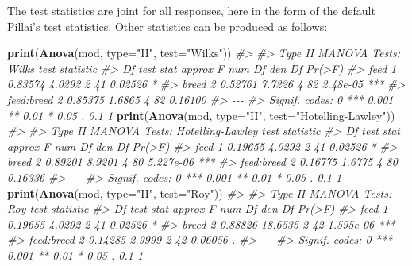 \documentclass[
]{article}
\newenvironment{Shaded}{\begin{snugshade}}{\end{snugshade}}
\newcommand{\AttributeTok}[1]{\textcolor[rgb]{0.13,0.29,0.53}{#1}}
\newcommand{\CommentTok}[1]{\textcolor[rgb]{0.56,0.35,0.01}{\textit{#1}}}
\newcommand{\FunctionTok}[1]{\textcolor[rgb]{0.13,0.29,0.53}{\textbf{#1}}}
\newcommand{\NormalTok}[1]{#1}
\newcommand{\StringTok}[1]{\textcolor[rgb]{0.31,0.60,0.02}{#1}}
\begin{document}
The test statistics are joint for all responses, here in the form of the
default Pillai's test statistics. Other statistics can be produced as
follows:

\begin{Shaded}
\begin{Highlighting}[]
\FunctionTok{print}\NormalTok{(}\FunctionTok{Anova}\NormalTok{(mod, }\AttributeTok{type=}\StringTok{"II"}\NormalTok{, }\AttributeTok{test=}\StringTok{"Wilks"}\NormalTok{))}
\CommentTok{\#\textgreater{} }
\CommentTok{\#\textgreater{} Type II MANOVA Tests: Wilks test statistic}
\CommentTok{\#\textgreater{}            Df test stat approx F num Df den Df   Pr(\textgreater{}F)    }
\CommentTok{\#\textgreater{} feed        1   0.83574   4.0292      2     41  0.02526 *  }
\CommentTok{\#\textgreater{} breed       2   0.52761   7.7226      4     82 2.48e{-}05 ***}
\CommentTok{\#\textgreater{} feed:breed  2   0.85375   1.6865      4     82  0.16100    }
\CommentTok{\#\textgreater{} {-}{-}{-}}
\CommentTok{\#\textgreater{} Signif. codes:  0 \textquotesingle{}***\textquotesingle{} 0.001 \textquotesingle{}**\textquotesingle{} 0.01 \textquotesingle{}*\textquotesingle{} 0.05 \textquotesingle{}.\textquotesingle{} 0.1 \textquotesingle{} \textquotesingle{} 1}
\FunctionTok{print}\NormalTok{(}\FunctionTok{Anova}\NormalTok{(mod, }\AttributeTok{type=}\StringTok{"II"}\NormalTok{, }\AttributeTok{test=}\StringTok{"Hotelling{-}Lawley"}\NormalTok{))}
\CommentTok{\#\textgreater{} }
\CommentTok{\#\textgreater{} Type II MANOVA Tests: Hotelling{-}Lawley test statistic}
\CommentTok{\#\textgreater{}            Df test stat approx F num Df den Df    Pr(\textgreater{}F)    }
\CommentTok{\#\textgreater{} feed        1   0.19655   4.0292      2     41   0.02526 *  }
\CommentTok{\#\textgreater{} breed       2   0.89201   8.9201      4     80 5.227e{-}06 ***}
\CommentTok{\#\textgreater{} feed:breed  2   0.16775   1.6775      4     80   0.16336    }
\CommentTok{\#\textgreater{} {-}{-}{-}}
\CommentTok{\#\textgreater{} Signif. codes:  0 \textquotesingle{}***\textquotesingle{} 0.001 \textquotesingle{}**\textquotesingle{} 0.01 \textquotesingle{}*\textquotesingle{} 0.05 \textquotesingle{}.\textquotesingle{} 0.1 \textquotesingle{} \textquotesingle{} 1}
\FunctionTok{print}\NormalTok{(}\FunctionTok{Anova}\NormalTok{(mod, }\AttributeTok{type=}\StringTok{"II"}\NormalTok{, }\AttributeTok{test=}\StringTok{"Roy"}\NormalTok{))}
\CommentTok{\#\textgreater{} }
\CommentTok{\#\textgreater{} Type II MANOVA Tests: Roy test statistic}
\CommentTok{\#\textgreater{}            Df test stat approx F num Df den Df    Pr(\textgreater{}F)    }
\CommentTok{\#\textgreater{} feed        1   0.19655   4.0292      2     41   0.02526 *  }
\CommentTok{\#\textgreater{} breed       2   0.88826  18.6535      2     42 1.595e{-}06 ***}
\CommentTok{\#\textgreater{} feed:breed  2   0.14285   2.9999      2     42   0.06056 .  }
\CommentTok{\#\textgreater{} {-}{-}{-}}
\CommentTok{\#\textgreater{} Signif. codes:  0 \textquotesingle{}***\textquotesingle{} 0.001 \textquotesingle{}**\textquotesingle{} 0.01 \textquotesingle{}*\textquotesingle{} 0.05 \textquotesingle{}.\textquotesingle{} 0.1 \textquotesingle{} \textquotesingle{} 1}
\end{Highlighting}
\end{Shaded}
\end{document}
